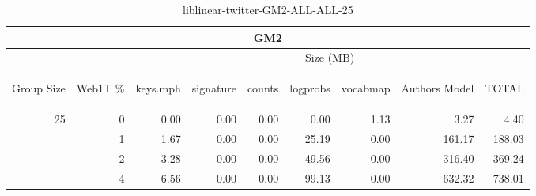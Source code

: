 \begin{center}
\begin{table}[htbp]
\begin{tabular}{ | r | r | r | r | r | r | r | r | r |}
\hline
\multicolumn{9}{|c|}{GM2}\\
\hline
 & & \multicolumn{7}{|c|}{Size (MB)}\\ \cline{3-9}
\begin{sideways}Group Size\end{sideways} & \begin{sideways}Web1T \% \end{sideways} & \begin{sideways}keys.mph\end{sideways} & \begin{sideways}signature\end{sideways} & \begin{sideways}counts\end{sideways} & \begin{sideways}logprobs\end{sideways} & \begin{sideways}vocabmap\end{sideways} & \begin{sideways}Authors Model \end{sideways} & \begin{sideways}TOTAL\end{sideways}\\
\hline
\multirow{3}{*}{25}
 & 0 & 0.00 & 0.00 & 0.00 & 0.00 & 1.13 & 3.27 & 4.40\\ \cline{2-9}
 & 1 & 1.67 & 0.00 & 0.00 & 25.19 & 0.00 & 161.17 & 188.03\\ \cline{2-9}
 & 2 & 3.28 & 0.00 & 0.00 & 49.56 & 0.00 & 316.40 & 369.24\\ \cline{2-9}
 & 4 & 6.56 & 0.00 & 0.00 & 99.13 & 0.00 & 632.32 & 738.01\\ \cline{2-9}
\hline
\end{tabular}
\caption{liblinear-twitter-GM2-ALL-ALL-25}
\label{table:liblinear-twitter-GM2-ALL-ALL-25}
\end{table}
\end{center}

